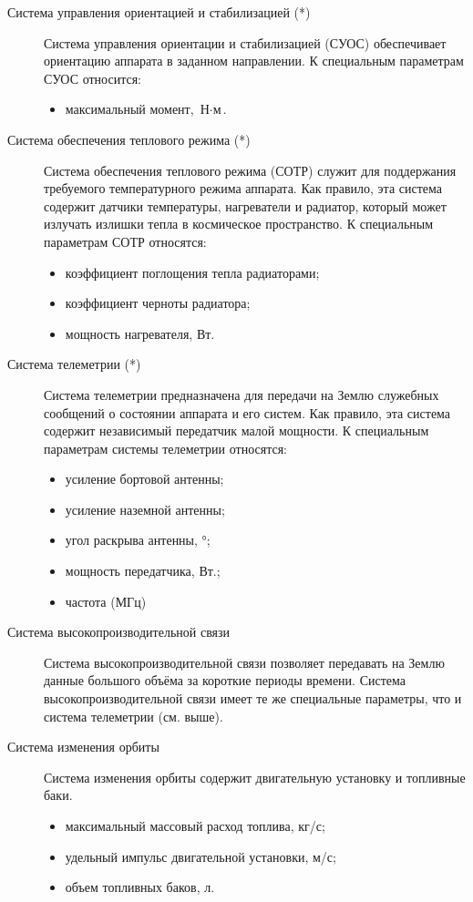 \documentclass[12pt,a4paper]{article}
\begin{document}
\begin{description}
\item [Система управления ориентацией и стабилизацией (*)] Система управления ориентации и
  стабилизацией (СУОС) обеспечивает ориентацию аппарата в заданном направлении. К
  специальным параметрам СУОС относится:
  \begin{itemize}
    \item максимальный момент, $\text{Н} \cdot \text{м}$.
  \end{itemize}

\item [Система обеспечения теплового режима (*)] Система обеспечения теплового
  режима (СОТР) служит для поддержания требуемого температурного режима аппарата. Как правило,
  эта система содержит датчики температуры, нагреватели и радиатор, который может излучать
  излишки тепла в космическое пространство. К специальным параметрам СОТР относятся:
  \begin{itemize}
  \item коэффициент поглощения тепла радиаторами;
  \item коэффициент черноты радиатора;
  \item мощность нагревателя, Вт.
  \end{itemize}

\item [Система телеметрии (*)] Система телеметрии предназначена для передачи на Землю
  служебных сообщений о состоянии аппарата и его систем. Как правило, эта система содержит
  независимый передатчик малой мощности. К специальным параметрам системы телеметрии
  относятся:
  \begin{itemize}
  \item усиление бортовой антенны;
  \item усиление наземной антенны;
  \item угол раскрыва антенны, °;
  \item мощность передатчика, Вт.;
  \item частота (МГц)
  \end{itemize}
  
\item [Система высокопроизводительной связи] Система высокопроизводительной связи
  позволяет передавать на Землю данные большого объёма за короткие периоды
  времени. Система высокопроизводительной связи имеет те же специальные параметры, что и
  система телеметрии (см. выше).

\item [Система изменения орбиты] Система изменения орбиты содержит двигательную установку
  и топливные баки.
  \begin{itemize}
    \item максимальный массовый расход топлива, кг/с;
    \item удельный импульс двигательной установки, м/с;
    \item объем топливных баков, л.
  \end{itemize}


\end{description}
\end{document}

